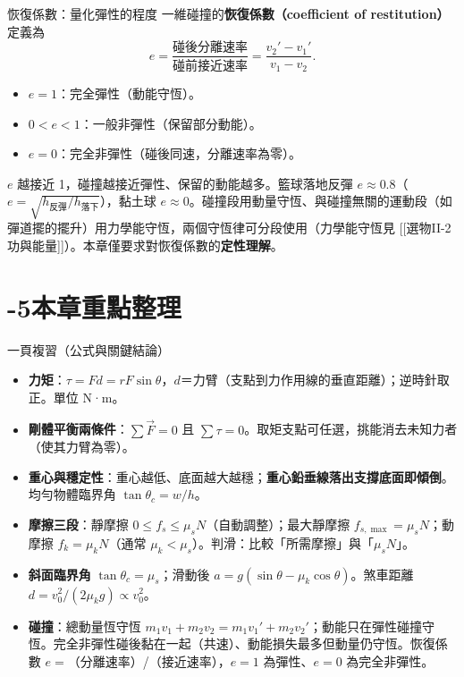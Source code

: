 \documentclass[11pt]{article}
\begin{document}
\begin{延伸框}{恢復係數：量化彈性的程度}
一維碰撞的\textbf{恢復係數（coefficient of restitution）}定義為
$$ e = \frac{\text{碰後分離速率}}{\text{碰前接近速率}} = \frac{v_2' - v_1'}{v_1 - v_2}. $$
\begin{itemize}\setlength{\itemsep}{1pt}
\item $e=1$：完全彈性（動能守恆）。
\item $0<e<1$：一般非彈性（保留部分動能）。
\item $e=0$：完全非彈性（碰後同速，分離速率為零）。
\end{itemize}
$e$ 越接近 1，碰撞越接近彈性、保留的動能越多。籃球落地反彈 $e\approx0.8$（$e=\sqrt{h_{\text{反彈}}/h_{\text{落下}}}$），黏土球 $e\approx0$。碰撞段用動量守恆、與碰撞無關的運動段（如彈道擺的擺升）用力學能守恆，兩個守恆律可分段使用（力學能守恆見 [[選物II-2 功與能量]]）。本章僅要求對恢復係數的\textbf{定性理解}。
\end{延伸框}

\section*{-5\quad 本章重點整理}

\begin{補充框}{一頁複習（公式與關鍵結論）}
\begin{itemize}\setlength{\itemsep}{2pt}
\item \textbf{力矩}：$\tau = Fd = rF\sin\theta$，$d$＝力臂（支點到力作用線的垂直距離）；逆時針取正。單位 N·m。
\item \textbf{剛體平衡兩條件}：$\sum\vec F=0$ 且 $\sum\tau=0$。取矩支點可任選，挑能消去未知力者（使其力臂為零）。
\item \textbf{重心與穩定性}：重心越低、底面越大越穩；\textbf{重心鉛垂線落出支撐底面即傾倒}。均勻物體臨界角 $\tan\theta_c=w/h$。
\item \textbf{摩擦三段}：靜摩擦 $0\le f_s\le\mu_s N$（自動調整）；最大靜摩擦 $f_{s,\max}=\mu_s N$；動摩擦 $f_k=\mu_k N$（通常 $\mu_k<\mu_s$）。判滑：比較「所需摩擦」與「$\mu_s N$」。
\item \textbf{斜面臨界角} $\tan\theta_c=\mu_s$；滑動後 $a=g(\sin\theta-\mu_k\cos\theta)$。煞車距離 $d=v_0^2/(2\mu_k g)\propto v_0^2$。
\item \textbf{碰撞}：總動量恆守恆 $m_1v_1+m_2v_2=m_1v_1'+m_2v_2'$；動能只在彈性碰撞守恆。完全非彈性碰後黏在一起（共速）、動能損失最多但動量仍守恆。恢復係數 $e=$（分離速率）/（接近速率），$e=1$ 為彈性、$e=0$ 為完全非彈性。
\end{itemize}
\end{補充框}
\end{document}
